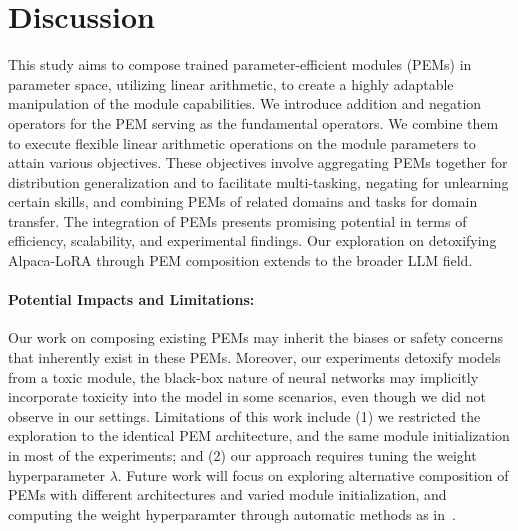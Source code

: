 
\section{Discussion}
This study aims to compose trained parameter-efficient modules (PEMs) in parameter space, utilizing linear arithmetic, to create a highly adaptable manipulation of the module capabilities.
We introduce addition and negation operators for the PEM serving as the fundamental operators. 
We combine them to execute flexible linear arithmetic operations on the module parameters to attain various objectives. These objectives involve aggregating PEMs together for distribution generalization and to facilitate multi-tasking, negating for unlearning certain skills, and combining PEMs of related domains and tasks for domain transfer.
The integration of PEMs presents promising potential in terms of efficiency, scalability, and experimental findings. 
Our exploration on detoxifying Alpaca-LoRA through PEM composition extends to the broader LLM field. 
\paragraph{Potential Impacts and Limitations:}
Our work on composing existing PEMs may inherit the biases or safety concerns that inherently exist in these PEMs. 
Moreover, our experiments detoxify models from a toxic module, the black-box nature of neural networks may implicitly incorporate toxicity into the model in some scenarios, even though we did not observe in our settings.
Limitations of this work include (1) we restricted the exploration to the identical PEM architecture, and the same module initialization in most of the experiments; and (2) our approach requires tuning the weight hyperparameter $\lambda$. Future work will focus on exploring alternative composition of PEMs with different architectures and varied module initialization, and computing the weight hyperparamter through automatic methods as in~\citet{jin2022dataless}.
